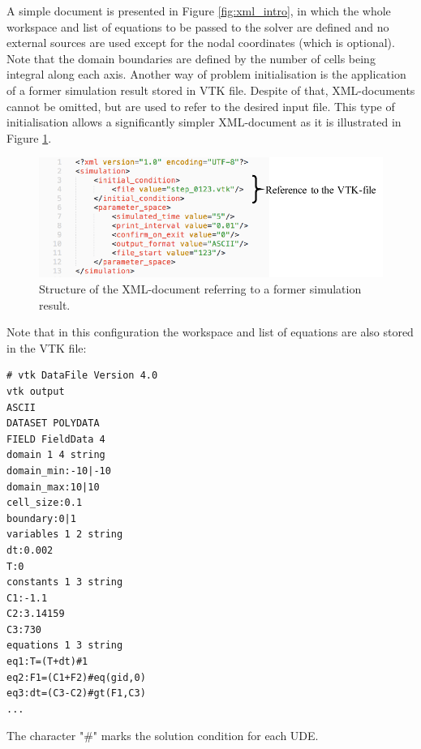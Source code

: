 \documentclass[a4paper,12pt,openany]{book}
\theoremstyle{break}
\begin{document}
A simple document is presented in Figure \ref{fig:xml_intro}, in which the whole workspace and list of equations to be passed to the solver are defined and no external sources are used except for the nodal coordinates (which is optional). Note that the domain boundaries are defined by the number of cells being integral along each axis. Another way of problem initialisation is the application of a former simulation result stored in VTK file. Despite of that, XML-documents cannot be omitted, but are used to refer to the desired input file. This type of initialisation allows a significantly simpler XML-document as it is illustrated in Figure \ref{fig:xml_intro_simple}.
\begin{figure}[H]
  \includegraphics[scale=1]{xml_intro_simple.pdf}
  \centering
  \caption{Structure of the XML-document referring to a former simulation result.}
  \label{fig:xml_intro_simple}
\end{figure}\vspace*{3pt}
\newpage
Note that in this configuration the workspace and list of equations are also stored in the VTK file:\\
\begin{lstlisting}
# vtk DataFile Version 4.0
vtk output
ASCII
DATASET POLYDATA
FIELD FieldData 4
domain 1 4 string
domain_min:-10|-10
domain_max:10|10
cell_size:0.1
boundary:0|1
variables 1 2 string
dt:0.002
T:0
constants 1 3 string
C1:-1.1
C2:3.14159
C3:730
equations 1 3 string
eq1:T=(T+dt)#1
eq2:F1=(C1+F2)#eq(gid,0)
eq3:dt=(C3-C2)#gt(F1,C3)
...
\end{lstlisting}
The character "\#" marks the solution condition for each UDE.
\end{document}
